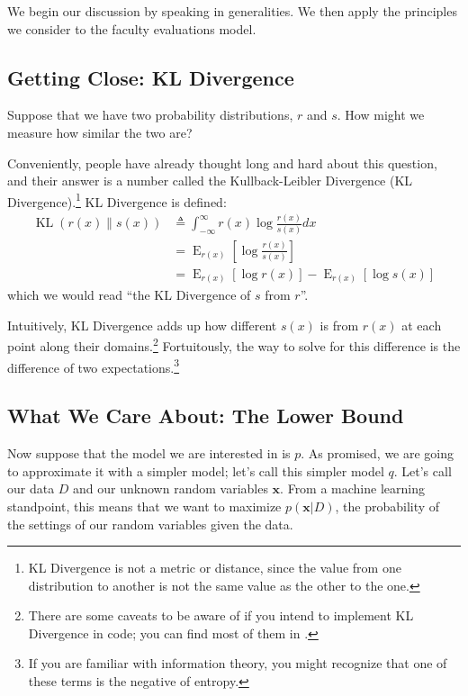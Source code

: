 \documentclass[12pt]{article}
\newcommand{\KL}{\operatorname{KL}}
\newcommand{\E}{\operatorname{E}}
\begin{document}
We begin our discussion by speaking in generalities.  We then apply the
principles we consider to the faculty evaluations model.

\subsection{Getting Close:  KL Divergence}

Suppose that we have two probability distributions, $r$ and $s$.  How might we
measure how similar the two are?

Conveniently, people have already thought long and hard about this question, and
their answer is a number called the Kullback-Leibler Divergence (KL
Divergence).\footnote{KL Divergence is not a metric or distance, since the value
from one distribution to another is not the same value as the other to the one.}
KL Divergence is defined:
\begin{align}\label{eq:kldivergence}
    \KL(r(x)\parallel s(x)) &\triangleq \int_{-\infty}^{\infty} r(x)
    \log{\frac{r(x)}{s(x)}}dx
    \nonumber \\
    &= \E_{r(x)}[\log \frac{r(x)}{s(x)}]
    \nonumber \\
    &= \E_{r(x)}[\log r(x)] - \E_{r(x)}[\log s(x)]
\end{align}
which we would read \enquote{the KL Divergence of $s$ from $r$}.

Intuitively, KL Divergence adds up how different $s(x)$ is from $r(x)$ at each
point along their domains.\footnote{There are some caveats to be aware of if you
intend to implement KL Divergence in code; you can find most of them in
\autocite{wikikl}.}  Fortuitously, the way to solve for this difference is the
difference of two expectations.\footnote{If you are familiar with information
theory, you might recognize that one of these terms is the negative of entropy.}

\subsection{What We Care About:  The Lower Bound}

Now suppose that the model we are interested in is $p$.  As promised, we are
going to approximate it with a simpler model; let's call this simpler model $q$.
Let's call our data $D$ and our unknown random variables $\bm{x}$.  From a
machine learning standpoint, this means that we want to maximize $p(\bm{x}|D)$,
the probability of the settings of our random variables given the data.
\end{document}

